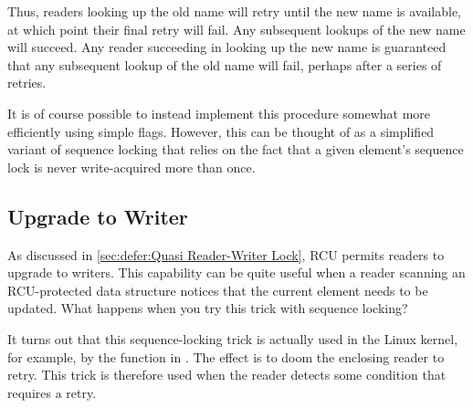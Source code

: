Thus, readers looking up the old name will retry until the new name
is available, at which point their final retry will fail.
Any subsequent lookups of the new name will succeed.
Any reader succeeding in looking up the new name is guaranteed that
any subsequent lookup of the old name will fail, perhaps after a series
of retries.


It is of course possible to instead implement this procedure somewhat
more efficiently using simple flags.
However, this can be thought of as a simplified variant of sequence
locking that relies on the fact that a given element's sequence lock is
never write-acquired more than once.


\subsection{Upgrade to Writer}
\label{sec:together:Upgrade to Writer}

As discussed in
\cref{sec:defer:Quasi Reader-Writer Lock},
RCU permits readers to upgrade to writers.
This capability can be quite useful when a reader scanning an
RCU-protected data structure notices that the current element
needs to be updated.
What happens when you try this trick with sequence locking?

It turns out that this sequence-locking trick is actually used in
the Linux kernel, for example, by the  function in
.
The effect is to doom the enclosing reader to retry.
This trick is therefore used when the reader detects some condition
that requires a retry.
